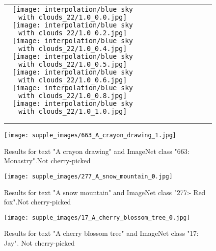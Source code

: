 \documentclass[10pt,twocolumn,letterpaper]{article}
\begin{document}
\begin{figure*}[tb!]
{\begin{tabular}{c c c c c c c c c c}
\tabularnewline
    \raisebox{0.1in}{\rotatebox{90}{\small \emph{}
 }}
  \texttt{[image: interpolation/blue sky with clouds\_22/1.0\_0.0.jpg]}
  \texttt{[image: interpolation/blue sky with clouds\_22/1.0\_0.2.jpg]}
   \texttt{[image: interpolation/blue sky with clouds\_22/1.0\_0.4.jpg]}
  \texttt{[image: interpolation/blue sky with clouds\_22/1.0\_0.5.jpg]}
  \texttt{[image: interpolation/blue sky with clouds\_22/1.0\_0.6.jpg]}
  \texttt{[image: interpolation/blue sky with clouds\_22/1.0\_0.8.jpg]}
  \texttt{[image: interpolation/blue sky with clouds\_22/1.0\_1.0.jpg]}
    \tabularnewline
        \raisebox{0.1in}{\rotatebox{90}{
 }}
 \hspace{0.5mm}

  \tabularnewline
\vspace{2mm}
\vspace{-2\baselineskip}
\end{tabular}}
\vspace{-0.8cm}
\hspace{20pt}
\label{fig:glideablation14}
\vspace{-2mm}
\end{figure*}  \begin{figure*}[t!]
	\centering
			\texttt{[image: supple\_images/663\_A\_crayon\_drawing\_1.jpg]}
	\centering
	\caption{Results for text "A crayon drawing" and ImageNet class "663: Monastry".Not cherry-picked}
	\label{fig:t2im3243}
	\vskip -10pt
\end{figure*}
 \begin{figure*}[t!]
	\centering
			\texttt{[image: supple\_images/277\_A\_snow\_mountain\_0.jpg]}
	\centering
	\caption{Results for text "A snow mountain" and ImageNet class "277:- Red fox".Not cherry-picked}
	\label{fig:t2im3223}
	\vskip -10pt
\end{figure*}
 \begin{figure*}[t!]
	\centering
			\texttt{[image: supple\_images/17\_A\_cherry\_blossom\_tree\_0.jpg]}
	\centering
	\caption{Results for text "A cherry blossom tree" and ImageNet class "17: Jay". Not cherry-picked}
	\label{fig:t2im154}
	\vskip -10pt
\end{figure*}
\end{document}
